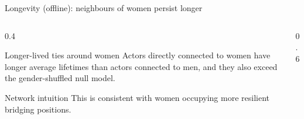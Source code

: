\begin{frame}{Longevity (offline): neighbours of women persist longer}
  \small
  \begin{columns}[T,onlytextwidth]
    \begin{column}{0.4\textwidth}
      \begin{block}{Longer-lived ties around women}
        Actors directly connected to women have longer average lifetimes than actors connected to men, and they also exceed the gender-shuffled null model.
      \end{block}

      \begin{exampleblock}{Network intuition}
        This is consistent with women occupying more resilient bridging positions.
      \end{exampleblock}
    \end{column}

    \begin{column}{0.6\textwidth}
    \end{column}
  \end{columns}

\end{frame}
